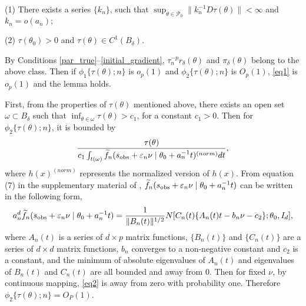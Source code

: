 \documentclass[9pt]{article}
\theoremstyle{remark}
\begin{document}
	\noindent (1) There exists a series $\{k_{n}\}$, such that $\sup_{\theta\in\mathcal{P}_{0}}\|k_{n}^{-1}D\tau(\theta)\|<\infty$
	and $k_{n}=o(a_{n});$ 
	
    \noindent (2)	$\tau(\theta_{0})>0$ and $\tau(\theta)\in C^{1}(B_{\delta}).$ 
	
	
	By Conditions \ref{par_true}--\ref{initial_gradient}, $\tau_{n}^{-p}r_{\delta}(\theta)$
	and $\pi_{\delta}(\theta)$ belong to the above class. Then if $\phi_{1}\{\tau(\theta);n\}$
	is $o_{p}(1)$ and $\phi_{2}\{\tau(\theta);n\}$ is $O_{p}(1)$, \eqref{eq1}
	is $o_{p}(1)$ and the lemma holds. 
	
	First, from the properties of $\tau(\theta)$ mentioned above, there exists an open set $\omega\subset B_{\delta}$
	such that $\inf_{\theta\in\omega}\tau(\theta)>c_{1}$, for a constant
	$c_{1}>0$. Then for $\phi_{2}\{\tau(\theta);n\}$, it is bounded
	by 
	\[
	\frac{\tau(\theta)}{c_{1}\int_{t(\omega)}\widetilde{f}_{n}(s_{{\rm obs}}+\varepsilon_{n}\nu\mid\theta_{0}+a_{n}^{-1}t)^{(norm)}dt},
	\]
	where $h(x)^{(norm)}$ represents the normalized version of $h(x)$.
	From equation (7) in the supplementary material of \cite{Li2016},
	$\widetilde{f}_{n}(s_{{\rm obs}}+\varepsilon_{n}\nu\mid\theta_0+a_{n}^{-1}t)$
	can be written in the following form, 
	\begin{eqnarray}
	a_{n}^{d}\widetilde{f}_{n}(s_{{\rm obs}}+\varepsilon_{n}\nu\mid\theta_0+a_{n}^{-1}t)=\frac{1}{\|B_{n}(t)\|^{1/2}}N[C_{n}(t)\{A_{n}(t)t-b_{n}\nu-c_{2}\};\theta_0,I_{d}],\label{eq2}
	\end{eqnarray}
	where $A_{n}(t)$ is a series of $d\times p$ matrix functions, $\{B_{n}(t)\}$
	and $\{C_{n}(t)\}$ are a series of $d\times d$ matrix functions,
	$b_{n}$ converges to a non-negative constant and $c_{2}$ is a constant,
	and the minimum of absolute eigenvalues of $A_{n}(t)$ and eigenvalues
	of $B_{n}(t)$ and $C_{n}(t)$ are all bounded and away from $0$.
	Then for fixed $\nu$, by continuous mapping, \eqref{eq2} is away
	from zero with probability one. Therefore $\phi_{2}\{\tau(\theta);n\}=O_{P}(1)$.
	
\end{document}
